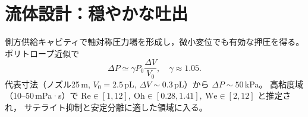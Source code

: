 \section{流体設計：穏やかな吐出}
側方供給キャビティで軸対称圧力場を形成し，微小変位でも有効な押圧を得る。
ポリトロープ近似で
\begin{equation}
\Delta P \simeq \gamma P_0 \frac{\Delta V}{V_0},\quad \gamma\approx1.05.
\end{equation}
代表寸法（ノズル25\,\textmu m, $V_0=2.5$\,pL, $\Delta V\sim0.3$\,pL）から
$\Delta P\sim50$\,kPa。
高粘度域（10–50\,mPa·s）で
$\mathrm{Re}\in[1,12],\ \mathrm{Oh}\in[0.28,1.41],\ \mathrm{We}\in[2,12]$ と推定され，
サテライト抑制と安定分離に適した領域に入る。
